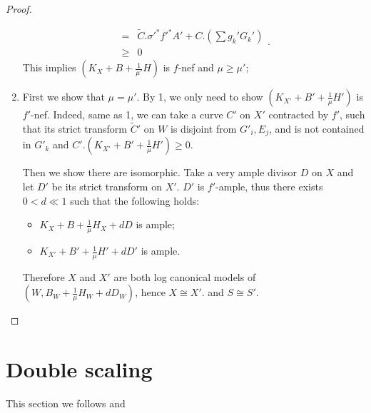\documentclass{article}
\begin{document}
\begin{proof}
\begin{enumerate}
\[\begin{aligned}
          =&\tilde{C}.\sigma'^*f'^*A'+C.\left(\sum g_k'G_k'\right)\\
          \geqslant&0
        \end{aligned}
      .\]
     This implies $ (K_X+B+\frac{1}{\mu'}H) $ is $ f $-nef and $ \mu\geqslant \mu' $;
   \item  First we show that $ \mu=\mu' $. By 1, we only need to show $ (K_{X'}+B'+\frac{1}{\mu}H') $ is $ f' $-nef. Indeed,  same as 1, we can take a curve $ C' $ on $X'$ contracted by $f'$, such that its strict transform $\tilde{C}'$ on $W$ is disjoint from  $ G'_i, E_j $, and is not contained in $ G'_k $ and 
     $C'.\left(K_{X'}+B'+\frac{1}{\mu}H'\right)\geqslant 0$.

Then we show there are isomorphic. Take a very ample divisor $ D $ on $ X $ and let $ D'  $ be its strict transform on $ X' $. $ D' $ is $ f' $-ample, thus there exists $ 0<d\ll1 $ such that the following holds:
      \begin{itemize}
        \item $ K_X+B+\frac{1}{\mu }H_X+dD $ is ample;
        \item $ K_{X'}+B'+\frac{1}{\mu }H'+dD' $ is ample.
      \end{itemize}
    Therefore $X$ and $X'$ are both log canonical models of $(W,B_{W}+\frac{1}{\mu}H_{W}+dD_{W})$, hence $X\cong X'$. and $S\cong S'$.  
  \end{enumerate} \end{proof}

\section{Double scaling}
This section we follows \cite[13.The Sarkisov program]{haconMinimalModelProgram2012} and  \cite{liuSarkisovProgramGeneralized2019}
\end{document}
